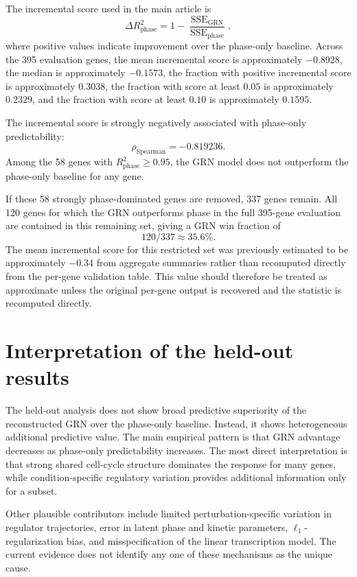 \documentclass[supplement,onefignum,onetabnum]{siamart251216}
\begin{document}
The incremental score used in the main article is
\[
\Delta R^2_{\mathrm{phase}}
=
1-\frac{\operatorname{SSE}_{\mathrm{GRN}}}{\operatorname{SSE}_{\mathrm{phase}}},
\]
where positive values indicate improvement over the phase-only baseline. Across the 395 evaluation genes, the mean incremental score is approximately \(-0.8928\), the median is approximately \(-0.1573\), the fraction with positive incremental score is approximately \(0.3038\), the fraction with score at least \(0.05\) is approximately \(0.2329\), and the fraction with score at least \(0.10\) is approximately \(0.1595\).

The incremental score is strongly negatively associated with phase-only predictability:
\[
\rho_{\mathrm{Spearman}}=-0.819236.
\]
Among the 58 genes with \(R^2_{\mathrm{phase}}\geq0.95\), the GRN model does not outperform the phase-only baseline for any gene.

If these 58 strongly phase-dominated genes are removed, 337 genes remain. All 120 genes for which the GRN outperforms phase in the full 395-gene evaluation are contained in this remaining set, giving a GRN win fraction of
\[
120/337\approx35.6\%.
\]
The mean incremental score for this restricted set was previously estimated to be approximately \(-0.34\) from aggregate summaries rather than recomputed directly from the per-gene validation table. This value should therefore be treated as approximate unless the original per-gene output is recovered and the statistic is recomputed directly.

\section{Interpretation of the held-out results}

The held-out analysis does not show broad predictive superiority of the reconstructed GRN over the phase-only baseline. Instead, it shows heterogeneous additional predictive value. The main empirical pattern is that GRN advantage decreases as phase-only predictability increases. The most direct interpretation is that strong shared cell-cycle structure dominates the response for many genes, while condition-specific regulatory variation provides additional information only for a subset.

Other plausible contributors include limited perturbation-specific variation in regulator trajectories, error in latent phase and kinetic parameters, \(\ell_1\)-regularization bias, and misspecification of the linear transcription model. The current evidence does not identify any one of these mechanisms as the unique cause.
\end{document}

